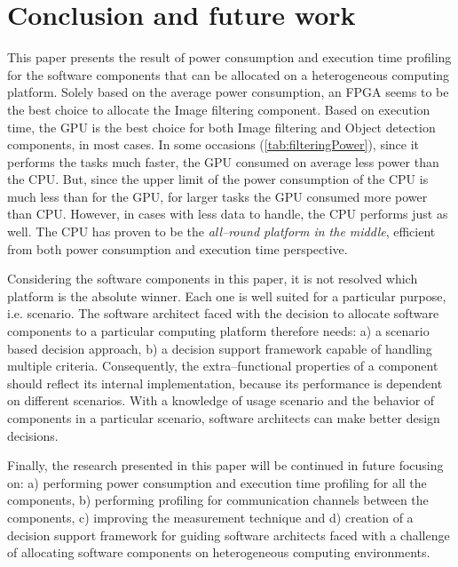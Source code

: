 \documentclass{sig-alternate}
\begin{document}
\section{Conclusion and future work}

This paper presents the result of power consumption and execution time profiling for the software components that can be allocated on a heterogeneous computing platform. Solely based on the average power consumption, an FPGA seems to be the best choice to allocate the Image filtering component. Based on execution time, the GPU is the best choice for both Image filtering and Object detection components, in most cases.
In some occasions (\autoref{tab:filteringPower}), since it performs the tasks much faster, the GPU consumed on average less power than the CPU. But, since the upper limit of the power consumption of the CPU is much less than for the GPU, for larger tasks the GPU consumed more power than CPU. 
However, in cases with less data to handle, the CPU performs just as well. The CPU has proven to be the \textsl{all--round platform in the middle}, efficient from both power consumption and execution time perspective. 

Considering the software components in this paper, it is not resolved which platform is the absolute winner. Each one is well suited for a particular purpose, i.e. scenario. The software architect faced with the decision to allocate software components to a particular computing platform therefore needs: a) a scenario based decision approach, b) a decision support framework capable of handling multiple criteria. Consequently, the extra--functional properties of a component should reflect its internal implementation, because its performance is dependent on different scenarios. With a knowledge of usage scenario and the behavior of components in a particular scenario, software architects can make better design decisions.

Finally, the research presented in this paper will be continued in future focusing on: a) performing power consumption and execution time profiling for all the components, b) performing profiling for communication channels between the components, c) improving the measurement technique and d) creation of a decision support framework for guiding software architects faced with a challenge of allocating software components on heterogeneous computing environments.  


%

%
%
\end{document}
